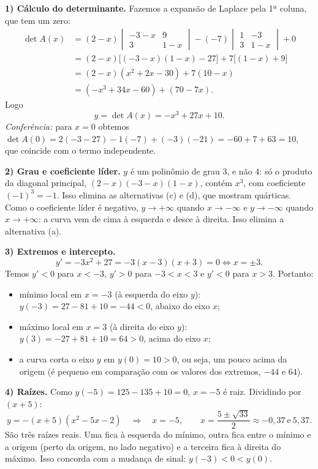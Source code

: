 \documentclass{article}%
\begin{document}
\textbf{1) Cálculo do determinante.} Fazemos a expansão de Laplace pela 1ª coluna, que tem um zero:
\begin{align*}
\det A(x) &= (2-x)\begin{vmatrix} -3-x & 9\\ 3 & 1-x\end{vmatrix}
-(-7)\begin{vmatrix} 1 & -3\\ 3 & 1-x\end{vmatrix} + 0\\
&= (2-x)\big[(-3-x)(1-x)-27\big] + 7\big[(1-x)+9\big]\\
&= (2-x)(x^2+2x-30) + 7(10-x)\\
&= (-x^3+34x-60) + (70-7x).
\end{align*}
Logo
\[
y=\det A(x) = -x^3+27x+10 .
\]
\emph{Conferência:} para $x=0$ obtemos $\det A(0)=2(-3-27)-1(-7)+(-3)(-21)=-60+7+63=10$, que coincide com o termo independente.

\textbf{2) Grau e coeficiente líder.} $y$ é um polinômio de grau $3$, e não $4$: só o produto da diagonal principal, $(2-x)(-3-x)(1-x)$, contém $x^3$, com coeficiente $(-1)^3=-1$. Isso elimina as alternativas (c) e (d), que mostram quárticas. Como o coeficiente líder é negativo, $y\to+\infty$ quando $x\to-\infty$ e $y\to-\infty$ quando $x\to+\infty$: a curva vem de cima à esquerda e desce à direita. Isso elimina a alternativa (a).

\textbf{3) Extremos e intercepto.}
\[
y'=-3x^2+27=-3(x-3)(x+3)=0 \iff x=\pm 3 .
\]
Temos $y'<0$ para $x<-3$, $y'>0$ para $-3<x<3$ e $y'<0$ para $x>3$. Portanto:
\begin{itemize}
\item mínimo local em $x=-3$ (à esquerda do eixo $y$): $y(-3)=27-81+10=-44<0$, abaixo do eixo $x$;
\item máximo local em $x=3$ (à direita do eixo $y$): $y(3)=-27+81+10=64>0$, acima do eixo $x$;
\item a curva corta o eixo $y$ em $y(0)=10>0$, ou seja, um pouco acima da origem (é pequeno em comparação com os valores dos extremos, $-44$ e $64$).
\end{itemize}

\textbf{4) Raízes.} Como $y(-5)=125-135+10=0$, $x=-5$ é raiz. Dividindo por $(x+5)$:
\[
y=-(x+5)(x^2-5x-2) \quad\Longrightarrow\quad x=-5,\qquad x=\frac{5\pm\sqrt{33}}{2}\approx -0{,}37 \ \text{e}\ 5{,}37 .
\]
São três raízes reais. Uma fica à esquerda do mínimo, outra fica entre o mínimo e a origem (perto da origem, no lado negativo) e a terceira fica à direita do máximo. Isso concorda com a mudança de sinal: $y(-3)<0<y(0)$.
\end{document}
